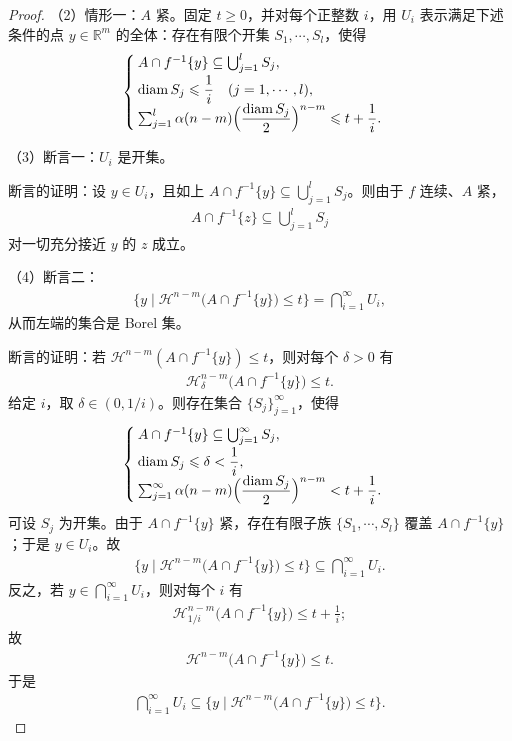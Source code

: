 \documentclass[../../main.tex]{subfiles}%
\begin{document}
\begin{proof}
（2）情形一：$A$ 紧。固定 $t\geqslant0$，并对每个正整数 $i$，用 $U_i$ 表示满足下述条件的点 $y\in\mathbb{R}^m$ 的全体：存在有限个开集 $S_1,\cdots,S_l$，使得
\begin{align*}
\begin{cases}
A\cap f^{-1}\{y\}\subseteq\bigcup_{j=1}^{l}S_j,\\[2pt]
\operatorname{diam}S_j\leqslant\dfrac{1}{i}\quad(j=1,\cdots,l),\\[2pt]
\sum_{j=1}^{l}\alpha(n-m)\Bigl(\dfrac{\operatorname{diam}S_j}{2}\Bigr)^{n-m}\leqslant t+\dfrac{1}{i}.
\end{cases}
\end{align*}

（3）断言一：$U_i$ 是开集。

断言的证明：设 $y\in U_i$，且如上 $A\cap f^{-1}\{y\}\subseteq\bigcup_{j=1}^{l}S_j$。则由于 $f$ 连续、$A$ 紧，
\begin{align*}
A\cap f^{-1}\{z\}\subseteq\bigcup_{j=1}^{l}S_j
\end{align*}
对一切充分接近 $y$ 的 $z$ 成立。

（4）断言二：
\begin{align*}
\bigl\{y\mid\mathcal{H}^{n-m}\bigl(A\cap f^{-1}\{y\}\bigr)\leqslant t\bigr\}=\bigcap_{i=1}^{\infty}U_i,
\end{align*}
从而左端的集合是 Borel 集。

断言的证明：若 $\mathcal{H}^{n-m}(A\cap f^{-1}\{y\})\leqslant t$，则对每个 $\delta>0$ 有
\begin{align*}
\mathcal{H}^{n-m}_{\delta}\bigl(A\cap f^{-1}\{y\}\bigr)\leqslant t.
\end{align*}
给定 $i$，取 $\delta\in(0,1/i)$。则存在集合 $\{S_j\}_{j=1}^{\infty}$，使得
\begin{align*}
\begin{cases}
A\cap f^{-1}\{y\}\subseteq\bigcup_{j=1}^{\infty}S_j,\\[2pt]
\operatorname{diam}S_j\leqslant\delta<\dfrac{1}{i},\\[2pt]
\sum_{j=1}^{\infty}\alpha(n-m)\Bigl(\dfrac{\operatorname{diam}S_j}{2}\Bigr)^{n-m}<t+\dfrac{1}{i}.
\end{cases}
\end{align*}
可设 $S_j$ 为开集。由于 $A\cap f^{-1}\{y\}$ 紧，存在有限子族 $\{S_1,\cdots,S_l\}$ 覆盖 $A\cap f^{-1}\{y\}$；于是 $y\in U_i$。故
\begin{align*}
\bigl\{y\mid\mathcal{H}^{n-m}\bigl(A\cap f^{-1}\{y\}\bigr)\leqslant t\bigr\}\subseteq\bigcap_{i=1}^{\infty}U_i.
\end{align*}
反之，若 $y\in\bigcap_{i=1}^{\infty}U_i$，则对每个 $i$ 有
\begin{align*}
\mathcal{H}^{n-m}_{1/i}\bigl(A\cap f^{-1}\{y\}\bigr)\leqslant t+\frac{1}{i};
\end{align*}
故
\begin{align*}
\mathcal{H}^{n-m}\bigl(A\cap f^{-1}\{y\}\bigr)\leqslant t.
\end{align*}
于是
\begin{align*}
\bigcap_{i=1}^{\infty}U_i\subseteq\bigl\{y\mid\mathcal{H}^{n-m}\bigl(A\cap f^{-1}\{y\}\bigr)\leqslant t\bigr\}.
\end{align*}


\end{proof}
\end{document}
